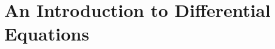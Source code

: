 \section{An Introduction to Differential Equations} \label{S:7.1.DEIntro}



\newpage



\newpage



\newpage



\newpage

\clearpage
